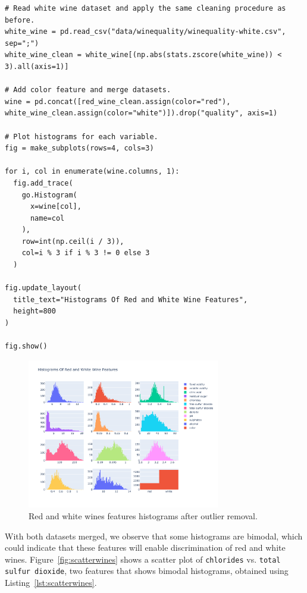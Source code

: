 \documentclass[12pt]{article}
\begin{document}
  \begin{lstlisting}[caption={Clean and merge white wine dataset.},
    captionpos=b, label={lst:whiteclean}]
# Read white wine dataset and apply the same cleaning procedure as before.
white_wine = pd.read_csv("data/winequality/winequality-white.csv", sep=";")
white_wine_clean = white_wine[(np.abs(stats.zscore(white_wine)) < 3).all(axis=1)]

# Add color feature and merge datasets.
wine = pd.concat([red_wine_clean.assign(color="red"), white_wine_clean.assign(color="white")]).drop("quality", axis=1)

# Plot histograms for each variable.
fig = make_subplots(rows=4, cols=3)

for i, col in enumerate(wine.columns, 1):
  fig.add_trace(
    go.Histogram(
      x=wine[col],
      name=col
    ), 
    row=int(np.ceil(i / 3)), 
    col=i % 3 if i % 3 != 0 else 3
  )
    
fig.update_layout(
  title_text="Histograms Of Red and White Wine Features",
  height=800
)

fig.show()
  \end{lstlisting}

  \begin{figure}[!ht]
    \centering
    \includegraphics[width=0.75\textwidth]{figures/wineshisto}
    \caption{Red and white wines features histograms after outlier removal.}%
    \label{fig:whiteclean}
  \end{figure} 

  \newpage

  With both datasets merged, we observe that some histograms are bimodal, which
  could indicate that these features will enable discrimination of red and
  white wines. Figure~\ref{fig:scatterwines} shows a scatter plot of
  \lstinline{chlorides} vs. \lstinline{total sulfur dioxide}, two features that
  shows bimodal histograms, obtained using Listing~\ref{lst:scatterwines}.
\end{document}
